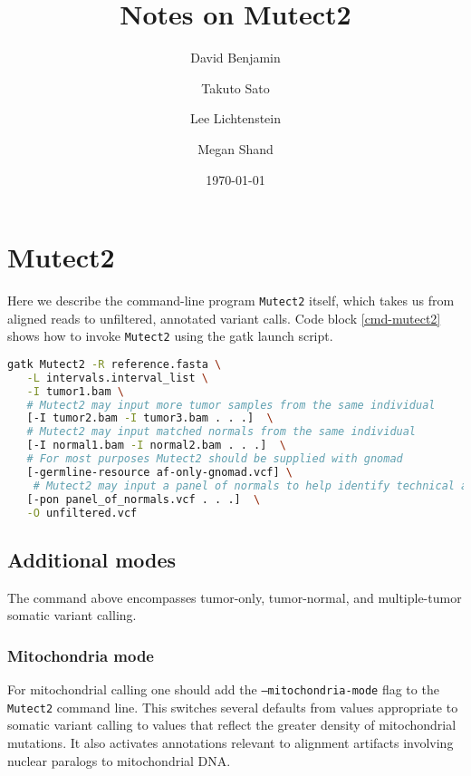 \documentclass[nofootinbib,amssymb,amsmath]{revtex4}
\newcommand{\code}[1]{\texttt{#1}}
\begin{document}
\title{Notes on Mutect2}
\author{David Benjamin}
\author{Takuto Sato}
\author{Lee Lichtenstein}
\author{Megan Shand}

\date{\today}

\maketitle

\section{Mutect2}
Here we describe the command-line program \code{Mutect2} itself, which takes us from aligned reads to unfiltered, annotated variant calls.  Code block \ref{cmd-mutect2} shows how to invoke \code{Mutect2} using the gatk launch script.

\begin{lstlisting}[language=bash,caption={Mutect2 command}, label={cmd-mutect2}]
gatk Mutect2 -R reference.fasta \
   -L intervals.interval_list \
   -I tumor1.bam \
   # Mutect2 may input more tumor samples from the same individual 
   [-I tumor2.bam -I tumor3.bam . . .]  \
   # Mutect2 may input matched normals from the same individual
   [-I normal1.bam -I normal2.bam . . .]  \
   # For most purposes Mutect2 should be supplied with gnomad
   [-germline-resource af-only-gnomad.vcf] \
    # Mutect2 may input a panel of normals to help identify technical artifacts
   [-pon panel_of_normals.vcf . . .]  \
   -O unfiltered.vcf
\end{lstlisting}

\subsection{Additional modes}
The command above encompasses tumor-only, tumor-normal, and multiple-tumor somatic variant calling.  

\subsubsection{Mitochondria mode}
For mitochondrial calling one should add the \code{--mitochondria-mode} flag to the \code{Mutect2} command line.  This switches several defaults from values appropriate to somatic variant calling to values that reflect the greater density of mitochondrial mutations.  It also activates annotations relevant to alignment artifacts involving nuclear paralogs to mitochondrial DNA.
\end{document}
